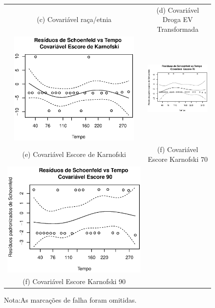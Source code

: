 \documentclass[
	12pt,				%
	openright,			%
	twoside,			%
	a4paper,			%
	english,			%
	brazil				%
	]{abntex2}
\begin{document}
\begin{figure}[!ht]
\begin{tabular}{cc}
(c) Covariável raça/etnia & (d) Covariável Droga EV Transformada \\[6pt]
 \includegraphics[width=65mm]{Rplot17} &   \includegraphics[width=65mm]{Rplot20} \\
(e) Covariável Escore de Karnofski & (f) Covariável Escore Karnofski 70 \\[6pt]
\includegraphics[widht=65mm]{Rplot21} & \\
(f) Covariável Escore Karnofski 90 \\[6pt]
  \end{tabular}
      \caption*{\tiny{Nota:As marcações de falha foram omitidas.}}
\end{figure}
\end{document}
